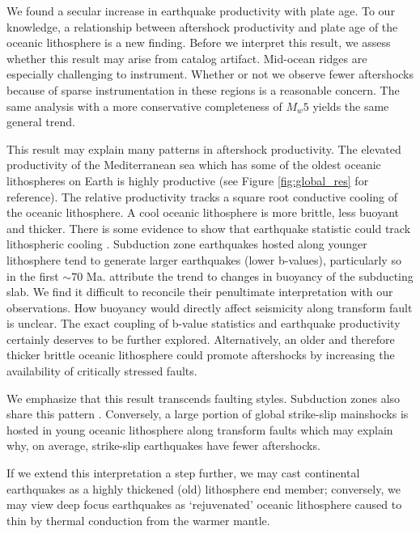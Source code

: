 \documentclass[12pt, notitlepage]{report}
\begin{document}
We found a secular increase in earthquake productivity with plate age. To our knowledge, a relationship between aftershock productivity and plate age of the oceanic lithosphere is a new finding. Before we interpret this result, we assess whether this result may arise from catalog artifact. Mid-ocean ridges are especially challenging to instrument. Whether or not we observe fewer aftershocks because of sparse instrumentation in these regions is a reasonable concern. The same analysis with a more conservative completeness of $M_w5$ yields the same general trend.

This result may explain many patterns in aftershock productivity. The elevated productivity of the Mediterranean sea which has some of the oldest oceanic lithospheres on Earth is highly productive (see Figure \ref{fig:global_res} for reference). The relative productivity tracks a square root conductive cooling of the oceanic lithosphere. A cool oceanic lithosphere is more brittle, less buoyant and thicker. There is some evidence to show that earthquake statistic could track lithospheric cooling \cite{Bird2003AnBoundaries, Bird2004Plate-TectonicSettings,Nishikawa2014EarthquakeBuoyancy}. Subduction zone earthquakes hosted along younger lithosphere tend to generate larger earthquakes (lower b-values), particularly so in the first $\sim70$ Ma.  \textcite{Nishikawa2014EarthquakeBuoyancy} attribute the trend to changes in buoyancy of the subducting slab. We find it difficult to reconcile their penultimate interpretation with our observations.  How buoyancy would directly affect seismicity along transform fault is unclear. The exact coupling of b-value statistics and earthquake productivity certainly deserves to be further explored. Alternatively, an older and therefore thicker brittle oceanic lithosphere could promote aftershocks by increasing the availability of critically stressed faults. 

We emphasize that this result transcends faulting styles. Subduction zones also share this pattern \cite{Wetzler2016}. Conversely, a large portion of global strike-slip mainshocks is hosted in young oceanic lithosphere along transform faults which may explain why, on average, strike-slip earthquakes have fewer aftershocks. 

If we extend this interpretation a step further, we may cast continental earthquakes as a highly thickened (old) lithosphere end member; conversely, we may view deep focus earthquakes as `rejuvenated' oceanic lithosphere caused to thin by thermal conduction from the warmer mantle. 
\end{document}
